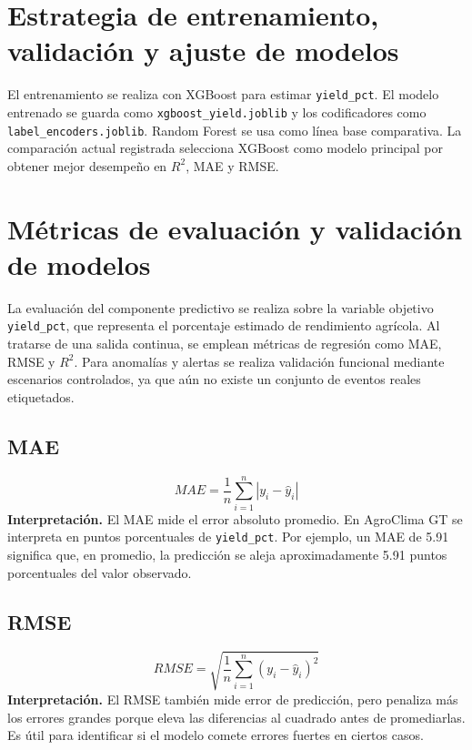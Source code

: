 \documentclass[12pt,letterpaper,oneside]{report}
\newcommand{\codigo}[1]{\texttt{#1}}
\begin{document}
\section{Estrategia de entrenamiento, validación y ajuste de modelos}
El entrenamiento se realiza con XGBoost para estimar \codigo{yield\_pct}. El modelo entrenado se guarda como \codigo{xgboost\_yield.joblib} y los codificadores como \codigo{label\_encoders.joblib}. Random Forest se usa como línea base comparativa. La comparación actual registrada selecciona XGBoost como modelo principal por obtener mejor desempeño en $R^2$, MAE y RMSE.

\section{Métricas de evaluación y validación de modelos}
La evaluación del componente predictivo se realiza sobre la variable objetivo \codigo{yield\_pct}, que representa el porcentaje estimado de rendimiento agrícola. Al tratarse de una salida continua, se emplean métricas de regresión como MAE, RMSE y $R^2$. Para anomalías y alertas se realiza validación funcional mediante escenarios controlados, ya que aún no existe un conjunto de eventos reales etiquetados.

\subsection{MAE}
\begin{equation}
MAE = \frac{1}{n}\sum_{i=1}^{n}|y_i-\hat{y}_i|
\end{equation}
\textbf{Interpretación.} El MAE mide el error absoluto promedio. En AgroClima GT se interpreta en puntos porcentuales de \codigo{yield\_pct}. Por ejemplo, un MAE de 5.91 significa que, en promedio, la predicción se aleja aproximadamente 5.91 puntos porcentuales del valor observado.

\subsection{RMSE}
\begin{equation}
RMSE = \sqrt{\frac{1}{n}\sum_{i=1}^{n}(y_i-\hat{y}_i)^2}
\end{equation}
\textbf{Interpretación.} El RMSE también mide error de predicción, pero penaliza más los errores grandes porque eleva las diferencias al cuadrado antes de promediarlas. Es útil para identificar si el modelo comete errores fuertes en ciertos casos.
\end{document}
